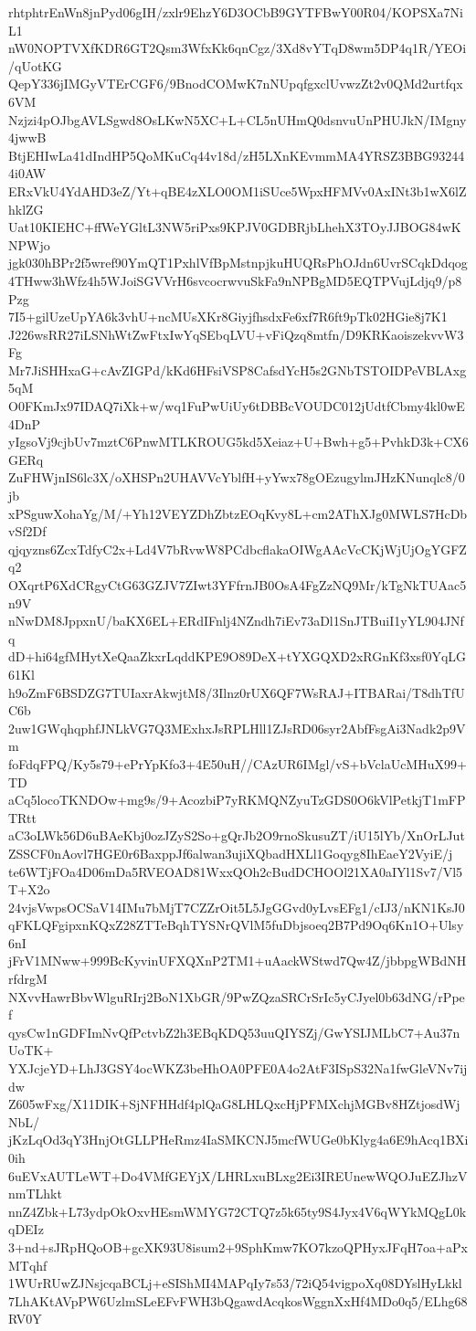 rhtphtrEnWn8jnPyd06gIH/zxlr9EhzY6D3OCbB9GYTFBwY00R04/KOPSXa7NiL1
nW0NOPTVXfKDR6GT2Qsm3WfxKk6qnCgz/3Xd8vYTqD8wm5DP4q1R/YEOi/qUotKG
QepY336jIMGyVTErCGF6/9BnodCOMwK7nNUpqfgxclUvwzZt2v0QMd2urtfqx6VM
Nzjzi4pOJbgAVLSgwd8OsLKwN5XC+L+CL5nUHmQ0dsnvuUnPHUJkN/IMgny4jwwB
BtjEHIwLa41dIndHP5QoMKuCq44v18d/zH5LXnKEvmmMA4YRSZ3BBG932444i0AW
ERxVkU4YdAHD3eZ/Yt+qBE4zXLO0OM1iSUce5WpxHFMVv0AxINt3b1wX6lZhklZG
Uat10KIEHC+ffWeYGltL3NW5riPxs9KPJV0GDBRjbLhehX3TOyJJBOG84wKNPWjo
jgk030hBPr2f5wref90YmQT1PxhlVfBpMstnpjkuHUQRsPhOJdn6UvrSCqkDdqog
4THww3hWfz4h5WJoiSGVVrH6svcocrwvuSkFa9nNPBgMD5EQTPVujLdjq9/p8Pzg
7I5+gilUzeUpYA6k3vhU+ncMUsXKr8GiyjfhsdxFe6xf7R6ft9pTk02HGie8j7K1
J226wsRR27iLSNhWtZwFtxIwYqSEbqLVU+vFiQzq8mtfn/D9KRKaoiszekvvW3Fg
Mr7JiSHHxaG+cAvZIGPd/kKd6HFsiVSP8CafsdYcH5s2GNbTSTOIDPeVBLAxg5qM
O0FKmJx97IDAQ7iXk+w/wq1FuPwUiUy6tDBBcVOUDC012jUdtfCbmy4kl0wE4DnP
yIgsoVj9cjbUv7mztC6PnwMTLKROUG5kd5Xeiaz+U+Bwh+g5+PvhkD3k+CX6GERq
ZuFHWjnIS6lc3X/oXHSPn2UHAVVcYblfH+yYwx78gOEzugylmJHzKNunqlc8/0jb
xPSguwXohaYg/M/+Yh12VEYZDhZbtzEOqKvy8L+cm2AThXJg0MWLS7HcDbvSf2Df
qjqyzns6ZcxTdfyC2x+Ld4V7bRvwW8PCdbcflakaOIWgAAcVcCKjWjUjOgYGFZq2
OXqrtP6XdCRgyCtG63GZJV7ZIwt3YFfrnJB0OsA4FgZzNQ9Mr/kTgNkTUAac5n9V
nNwDM8JppxnU/baKX6EL+ERdIFnlj4NZndh7iEv73aDl1SnJTBuiI1yYL904JNfq
dD+hi64gfMHytXeQaaZkxrLqddKPE9O89DeX+tYXGQXD2xRGnKf3xsf0YqLG61Kl
h9oZmF6BSDZG7TUIaxrAkwjtM8/3Ilnz0rUX6QF7WsRAJ+ITBARai/T8dhTfUC6b
2uw1GWqhqphfJNLkVG7Q3MExhxJsRPLHll1ZJsRD06syr2AbfFsgAi3Nadk2p9Vm
foFdqFPQ/Ky5s79+ePrYpKfo3+4E50uH//CAzUR6IMgl/vS+bVclaUcMHuX99+TD
aCq5locoTKNDOw+mg9s/9+AcozbiP7yRKMQNZyuTzGDS0O6kVlPetkjT1mFPTRtt
aC3oLWk56D6uBAeKbj0ozJZyS2So+gQrJb2O9rnoSkusuZT/iU15lYb/XnOrLJut
ZSSCF0nAovl7HGE0r6BaxppJf6alwan3ujiXQbadHXLl1Goqyg8IhEaeY2VyiE/j
te6WTjFOa4D06mDa5RVEOAD81WxxQOh2cBudDCHOOl21XA0aIYl1Sv7/Vl5T+X2o
24vjsVwpsOCSaV14IMu7bMjT7CZZrOit5L5JgGGvd0yLvsEFg1/cIJ3/nKN1KsJ0
qFKLQFgipxnKQxZ28ZTTeBqhTYSNrQVlM5fuDbjsoeq2B7Pd9Oq6Kn1O+Ulsy6nI
jFrV1MNww+999BcKyvinUFXQXnP2TM1+uAackWStwd7Qw4Z/jbbpgWBdNHrfdrgM
NXvvHawrBbvWlguRIrj2BoN1XbGR/9PwZQzaSRCrSrIc5yCJyel0b63dNG/rPpef
qysCw1nGDFImNvQfPctvbZ2h3EBqKDQ53uuQIYSZj/GwYSIJMLbC7+Au37nUoTK+
YXJcjeYD+LhJ3GSY4ocWKZ3beHhOA0PFE0A4o2AtF3ISpS32Na1fwGleVNv7ijdw
Z605wFxg/X11DIK+SjNFHHdf4plQaG8LHLQxcHjPFMXchjMGBv8HZtjosdWjNbL/
jKzLqOd3qY3HnjOtGLLPHeRmz4IaSMKCNJ5mcfWUGe0bKlyg4a6E9hAcq1BXi0ih
6uEVxAUTLeWT+Do4VMfGEYjX/LHRLxuBLxg2Ei3IREUnewWQOJuEZJhzVnmTLhkt
nnZ4Zbk+L73ydpOkOxvHEsmWMYG72CTQ7z5k65ty9S4Jyx4V6qWYkMQgL0kqDEIz
3+nd+sJRpHQoOB+gcXK93U8isum2+9SphKmw7KO7kzoQPHyxJFqH7oa+aPxMTqhf
1WUrRUwZJNsjcqaBCLj+eSIShMI4MAPqIy7s53/72iQ54vigpoXq08DYslHyLkkl
7LhAKtAVpPW6UzlmSLeEFvFWH3bQgawdAcqkosWggnXxHf4MDo0q5/ELhg68RV0Y

